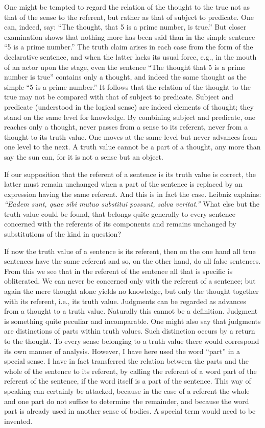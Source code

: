 \documentclass[twoside,12pt,a4paper]{article}
\begin{document}
One might be tempted to regard the relation of the thought to the true
not as that of the sense to the referent, but rather as that of
subject to predicate. One can, indeed, say: ``The thought, that 5 is a
prime number, is true.'' But closer examination shows that nothing
more has been said than in the simple sentence ``5 is a prime
number.'' The truth claim arises in each case from the form of the
declarative sentence, and when the latter lacks its usual force, e.g.,
in the mouth of an actor upon the stage, even the sentence ``The
thought that 5 is a prime number is true'' contains only a thought,
and indeed the same thought as the simple ``5 is a prime number.'' It
follows that the relation of the thought to the true may not be
compared with that of subject to predicate.  Subject
and predicate (understood in the logical sense) are indeed elements of
thought; they stand on the same level for knowledge. By combining
subject and predicate, one reaches only a thought, never passes from a
sense to its referent, never from a thought to its truth value. One
moves at the same level but never advances from one level to the next.
A truth value cannot be a part of a thought, any more than say the sun
can, for it is not a sense but an object.

If our supposition that the referent of a sentence is its truth value
is correct, the latter must remain unchanged when a part of the
sentence is replaced by an expression having the same referent. And
this is in fact the case. Leibniz explains: {\it ``Eadem sunt, quae
  sibi mutuo substitui possunt, salva veritat.''} What else but the
truth value could be found, that belongs quite generally to every
sentence concerned with the referents of its components and remains
unchanged by substitutions of the kind in question?

If now the truth value of a sentence is its referent, then on the one
hand all true sentences have the same referent and so, on the other
hand, do all false sentences. From this we see that in the referent of
the sentence all that is specific is obliterated. We can never be
concerned only with the referent of a sentence; but again the mere
thought alone yields no knowledge, but only the thought together with
its referent, i.e., its truth value. Judgments can be regarded as
advances from a thought to a truth value. Naturally this cannot be a
definition. Judgment is something quite peculiar and incomparable. One
might also say that judgments are distinctions of parts within truth
values. Such distinction occurs by a return to the thought. To every
sense belonging to a truth value there would correspond its own manner
of analysis. However, I have here used the word ``part'' in a special
sense. I have in fact transferred the relation between the parts and
the whole of the sentence to its referent, by calling the referent of
a word part of the referent of the sentence, if the word itself is a
part of the sentence. This way of speaking can certainly be attacked,
because in the case of a referent the whole and one part do not
suffice to determine the remainder, and because the word part is
already used in another sense of bodies. A special term would need to
be invented.
\end{document}
